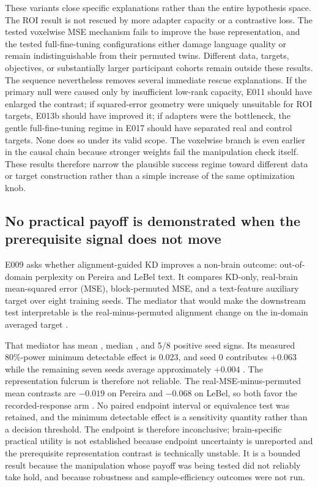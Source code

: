 These variants close specific explanations rather than the entire hypothesis space.
The ROI result is not rescued by more adapter capacity or a contrastive loss.
The tested voxelwise MSE mechanism fails to improve the base representation, and the tested full-fine-tuning configurations either damage language quality or remain indistinguishable from their permuted twins.
Different data, targets, objectives, or substantially larger participant cohorts remain outside these results.
The sequence nevertheless removes several immediate rescue explanations.
If the primary null were caused only by insufficient low-rank capacity, E011 should have enlarged the contrast; if squared-error geometry were uniquely unsuitable for ROI targets, E013b should have improved it; if adapters were the bottleneck, the gentle full-fine-tuning regime in E017 should have separated real and control targets.
None does so under its valid scope.
The voxelwise branch is even earlier in the causal chain because stronger weights fail the manipulation check itself.
These results therefore narrow the plausible success regime toward different data or target construction rather than a simple increase of the same optimization knob.

\subsection{No practical payoff is demonstrated when the prerequisite signal does not move}
\label{sec:results-practical}

E009 asks whether alignment-guided KD improves a non-brain outcome: out-of-domain perplexity on Pereira and LeBel text.
It compares KD-only, real-brain mean-squared error (MSE), block-permuted MSE, and a text-feature auxiliary target over eight training seeds.
The mediator that would make the downstream test interpretable is the real-minus-permuted alignment change on the in-domain averaged target .

That mediator has mean , median , and 5/8 positive seed signs.
Its measured 80\%-power minimum detectable effect is $0.023$, and seed 0 contributes $+0.063$ while the remaining seven seeds average approximately $+0.004$ .
The representation fulcrum is therefore not reliable.
The real-MSE-minus-permuted mean contrasts are $-0.019$ on Pereira and $-0.068$ on LeBel, so both favor the recorded-response arm .
No paired endpoint interval or equivalence test was retained, and the minimum detectable effect is a sensitivity quantity rather than a decision threshold.
The endpoint is therefore inconclusive; brain-specific practical utility is not established because endpoint uncertainty is unreported and the prerequisite representation contrast is technically unstable.
It is a bounded result because the manipulation whose payoff was being tested did not reliably take hold, and because robustness and sample-efficiency outcomes were not run.

